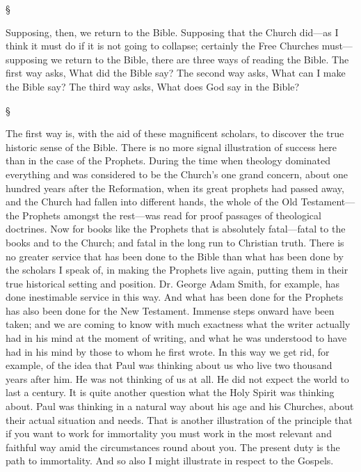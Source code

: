 \documentclass[12pt,a5paper,twoside,titlepage]{book}
\begin{document}
\begin{center}
\S
\end{center} 

Supposing, then, we return to the Bible. 
Supposing that the Church did---as I think it 
must do if it is not going to collapse; certainly 
the Free Churches must---supposing we return 
to the Bible, there are three ways of reading the 
Bible. The first way asks, What did the Bible 
say? The second way asks, What can I make 
the Bible say? The third way asks, What does 
God say in the Bible? 

\begin{center}
\S
\end{center} 

The first way is, with the aid of these magnificent 
scholars, to discover the true historic 
sense of the Bible. There is no more signal 
illustration of success here than in the case of 
the Prophets. During the time when theology 
dominated everything and was considered to 
be the Church's one grand concern, about one 
hundred years after the Reformation, when 
its great prophets had passed away, and the 
Church had fallen into different hands, the 
whole of the Old Testament---the Prophets 
amongst the rest---was read for proof passages 
of theological doctrines. Now for books like 
the Prophets that is absolutely fatal---fatal to 
the books and to the Church; and fatal in the 
long run to Christian truth. There is no greater 
service that has been done to the Bible than 
what has been done by the scholars I speak 
of, in making the Prophets live again, putting 
them in their true historical setting and position. 
Dr. George Adam Smith, for example, has done 
inestimable service in this way. And what 
has been done for the Prophets has also been 
done for the New Testament. Immense steps 
onward have been taken; and we are coming 
to know with much exactness what the writer 
actually had in his mind at the moment of 
writing, and what he was understood to have 
had in his mind by those to whom he first 
wrote. In this way we get rid, for example, 
of the idea that Paul was thinking about us 
who live two thousand years after him. He 
was not thinking of us at all. He did not 
expect the world to last a century. It is quite 
another question what the Holy Spirit was 
thinking about. Paul was thinking in a natural 
way about his age and his Churches, about their 
actual situation and needs. That is another 
illustration of the principle that if you want 
to work for immortality you must work in 
the most relevant and faithful way amid the 
circumstances round about you. The present 
duty is the path to immortality. And so also 
I might illustrate in respect to the Gospels. 
\end{document}

